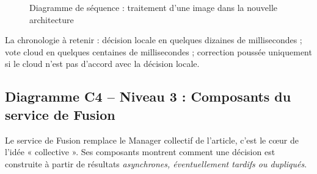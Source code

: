 \documentclass[11pt,a4paper]{article}
\begin{document}
\begin{figure}[h]
{
}
\caption{Diagramme de séquence : traitement d'une image dans la nouvelle architecture}
\end{figure}

La chronologie à retenir : décision locale en quelques dizaines de millisecondes ; vote cloud en quelques centaines de millisecondes ; correction poussée uniquement si le cloud n'est pas d'accord avec la décision locale.

\subsection{Diagramme C4 -- Niveau 3 : Composants du service de Fusion}

Le service de Fusion remplace le Manager collectif de l'article, c'est le cœur de l'idée « collective ». Ses composants montrent comment une décision est construite à partir de résultats \emph{asynchrones, éventuellement tardifs ou dupliqués}.
\end{document}
